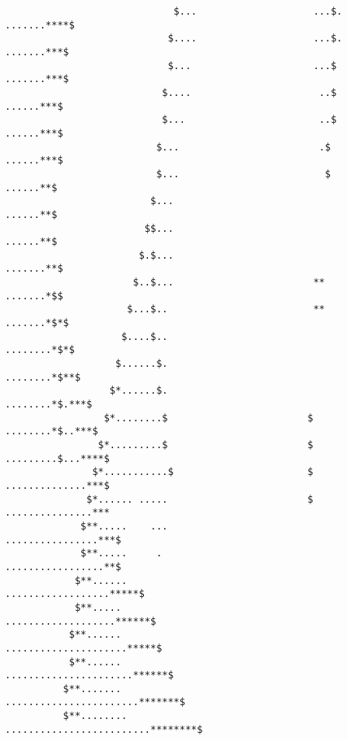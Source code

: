 \begin{verbatim}
                             $...                    ...$.                              .......****$
                            $....                    ...$.                              .......***$
                            $...                     ...$                              .......***$
                           $....                      ..$                              ......***$
                           $...                       ..$                              ......***$
                          $...                        .$                              ......***$
                          $...                         $                              ......**$
                         $...                                                        ......**$
                        $$...                                                       ......**$
                       $.$...                                                      .......**$
                      $..$...                        **                            .......*$$
                     $...$..                         **                           .......*$*$
                    $....$..                                                     ........*$*$
                   $......$.                                                    ........*$**$
                  $*......$.                                                   ........*$.***$
                 $*........$                        $                         ........*$..***$
                $*.........$                        $                        .........$...****$
               $*...........$                       $                        ..............***$
              $*...... .....                        $                       ...............***
             $**.....    ...                                               ................***$
             $**.....     .                                                .................**$
            $**......                                                     ..................*****$
            $**.....                                                     ...................******$
           $**......                                                    .....................*****$
           $**......                                                   ......................******$
          $**.......                                                  .......................*******$
          $**........                                               .........................********$

\end{verbatim}
